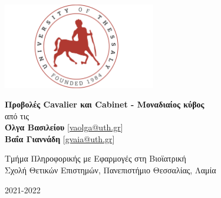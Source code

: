 
\begin{titlepage}

\begin{center}

\includegraphics[width=0.5\textwidth]{images/uthlogo}\\
\vspace{3em}

\Large \textbf {Προβολές \textlatin{Cavalier} και \textlatin{Cabinet} - Μοναδιαίος κύβος}\\
\vspace{1.5em}
\normalsize από τις \\
\vspace{1.5em}
\textup{\small {\bf Όλγα Βασιλείου} [\textlatin{\href{mailto:vaolga@uth.gr}{vaolga@uth.gr}}]\\ \vspace{.5em} {\bf Βαΐα Γιαννάδη} [\textlatin{\href{mailto:gvaia@uth.gr}{gvaia@uth.gr}}]}

\vspace{4in}
Τμήμα Πληροφορικής με Εφαρμογές στη Βιοϊατρική \\
Σχολή Θετικών Επιστημών, Πανεπιστήμιο Θεσσαλίας, Λαμία
\vspace{2em}

\vfill
2021-2022

\end{center}

\end{titlepage}
